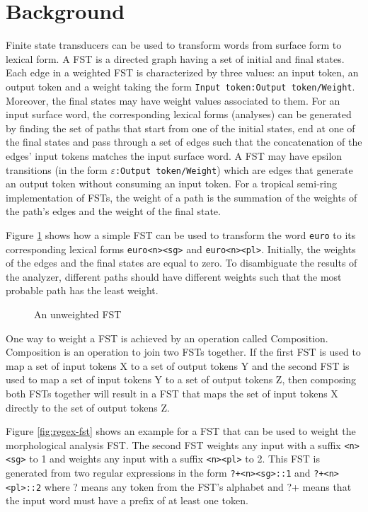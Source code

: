 \documentclass[free]{flammie}
\begin{document}
\section{Background}
Finite state transducers can be used to transform words from surface form to
lexical form. A FST is a directed graph having a set of initial and final
states. Each edge in a weighted FST is characterized by three values: an input
token, an output token and a weight taking the form \texttt{Input token:Output
token/Weight}. Moreover, the final states may have weight values associated to
them. For an input surface word, the corresponding lexical forms (analyses) can
be generated by finding the set of paths that start from one of the initial
states, end at one of the final states and pass through a set of edges such that
the concatenation of the edges' input tokens matches the input surface word. A
FST may have epsilon transitions (in the form \texttt{\(\varepsilon\):Output
token/Weight}) which are edges that generate an output token without consuming
an input token.
For a tropical semi-ring implementation of FSTs, the weight of a path is the
summation of the weights of the path's edges and the weight of the final state.

Figure \ref{fig:unweighted-fst} shows how a simple FST can be used to transform
the word \texttt{euro} to its corresponding lexical forms \texttt{euro<n><sg>}
and \texttt{euro<n><pl>}. Initially, the weights of the edges and the final
states are equal to zero. To disambiguate the results of the analyzer, different
paths should have different weights such that the most probable path has the
least weight.

\begin{figure}
\caption{\label{fig:unweighted-fst} An unweighted FST}
\end{figure}

One way to weight a FST is achieved by an operation called Composition.
Composition is an operation to join two FSTs together.
If the first FST is used to map a set of input tokens X to a set of output
tokens Y and the second FST is used to map a set of input tokens Y to a set of
output tokens Z, then composing both FSTs together will result in a FST that
maps the set of input tokens X directly to the set of output tokens Z.

Figure \ref{fig:regex-fst} shows an example for a FST that can be used to weight
the morphological analysis FST. The second FST weights any input with a suffix
\texttt{<n><sg>} to 1 and weights any input with a suffix \texttt{<n><pl>} to 2.
This FST is generated from two regular expressions in the form
\texttt{?+<n><sg>::1} and \texttt{?+<n><pl>::2} where ? means any token from the
FST's alphabet and ?+ means that the input word must have a prefix of at least
one token.
\end{document}
